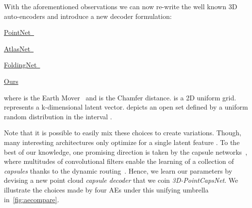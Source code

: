 \documentclass[10pt,twocolumn,letterpaper]{article}
\theoremstyle{break}
\begin{document}
With the aforementioned observations we can now re-write the well known 3D auto-encoders and introduce a new decoder formulation:\vspace{3mm}\newline
\begin{minipage}[c]{0.35\columnwidth}
\centering 
\underline{PointNet~\cite{qi2017pointnet}}

\end{minipage} 
\begin{minipage}[c]{0.55\columnwidth}
\centering 
\underline{AtlasNet~\cite{groueix2018}}

\end{minipage}\vspace{3mm}
\begin{minipage}[c]{0.35\columnwidth}
\centering 
\underline{FoldingNet~\cite{Yang_2018_CVPR}}

\end{minipage} 
\begin{minipage}[c]{0.61\columnwidth}
\centering 
\underline{Ours}

\end{minipage}\vspace{3mm}
where  is the Earth Mover~\cite{rubner2000earth} and  is the Chamfer distance.  is a 2D uniform grid.  represents a k-dimensional latent vector.  depicts an open set defined by a uniform random distribution in the interval . 

Note that it is possible to easily mix these choices to create variations\footnotemark[4]. Though, many interesting architectures only optimize for a single latent feature . To the best of our knowledge, one promising direction is taken by the capsule networks~\cite{hinton2011transforming}, where multitudes of convolutional filters enable the learning of a collection of \textit{capsules}  thanks to the dynamic routing~\cite{sabour2017dynamic}. Hence, we learn our parameters  by devising a new point cloud \textit{capsule decoder} that we coin \textit{3D-PointCapsNet}. We illustrate the choices made by four AEs under this unifying umbrella in~\cref{fig:aecompare}.
\end{document}
